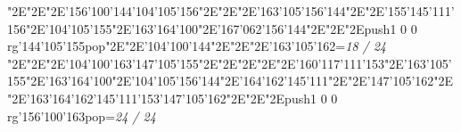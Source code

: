\null\vfill\enskip\enskip\enskip\ipa\char"2E\enskip\enskip\enskip\ipa\char"2E\enskip\ipa\char"2E\ipa\char'156\ipa\char'100\ipa\char'144\bigskip\ipa\char'104\ipa\char'105\ipa\char'156\ipa\char"2E\enskip\enskip\enskip\ipa\char"2E\enskip\enskip\enskip\enskip\enskip\enskip\bigskip\enskip\enskip\ipa\char"2E\ipa\char'163\ipa\char'105\ipa\char'156\ipa\char'144\ipa\char"2E\enskip\ipa\char"2E\ipa\char'155\ipa\char'145\ipa\char'111\ipa\char'156\ipa\char"2E\ipa\char'104\ipa\char'105\ipa\char'155\ipa\char"2E\ipa\char'163\ipa\char'164\ipa\char'100\ipa\char"2E\ipa\char'167\ipa\char'062\ipa\char'156\ipa\char'144\bigskip\enskip\ipa\char"2E\enskip\enskip\enskip\enskip\ipa\char"2E\enskip\enskip\ipa\char"2E\pdfcolorstack\match push{1 0 0 rg}\ipa\char'144\ipa\char'105\ipa\char'155\pdfcolorstack\match pop{}\ipa\char"2E\enskip\enskip\ipa\char"2E\enskip\enskip\enskip\enskip\enskip\enskip\bigskip\ipa\char'104\ipa\char'100\ipa\char'144\ipa\char"2E\enskip\enskip\ipa\char"2E\enskip\enskip\enskip\ipa\char"2E\ipa\char'163\ipa\char'105\ipa\char'162\bigskip\vfill\footline={\hfill\tenrm\it 18 / 24}\eject
\null\vfill\enskip\enskip\enskip\ipa\char"2E\enskip\enskip\enskip\ipa\char"2E\enskip\ipa\char"2E\ipa\char'104\ipa\char'100\ipa\char'163\bigskip\ipa\char'147\ipa\char'105\ipa\char'155\ipa\char"2E\enskip\enskip\enskip\ipa\char"2E\enskip\enskip\enskip\enskip\enskip\enskip\bigskip\enskip\enskip\ipa\char"2E\enskip\enskip\enskip\enskip\ipa\char"2E\enskip\ipa\char"2E\ipa\char'160\ipa\char'117\ipa\char'111\ipa\char'153\ipa\char"2E\ipa\char'163\ipa\char'105\ipa\char'155\ipa\char"2E\ipa\char'163\ipa\char'164\ipa\char'100\ipa\char"2E\ipa\char'104\ipa\char'105\ipa\char'156\ipa\char'144\bigskip\enskip\ipa\char"2E\ipa\char'164\ipa\char'162\ipa\char'145\ipa\char'111\ipa\char"2E\enskip\enskip\ipa\char"2E\ipa\char'147\ipa\char'105\ipa\char'162\ipa\char"2E\enskip\enskip\ipa\char"2E\ipa\char'163\ipa\char'164\ipa\char'162\ipa\char'145\ipa\char'111\ipa\char'153\bigskip\ipa\char'147\ipa\char'105\ipa\char'162\ipa\char"2E\enskip\enskip\ipa\char"2E\enskip\enskip\enskip\ipa\char"2E\pdfcolorstack\match push{1 0 0 rg}\ipa\char'156\ipa\char'100\ipa\char'163\pdfcolorstack\match pop{}\bigskip\vfill\footline={\hfill\tenrm\it 24 / 24}\eject\bye